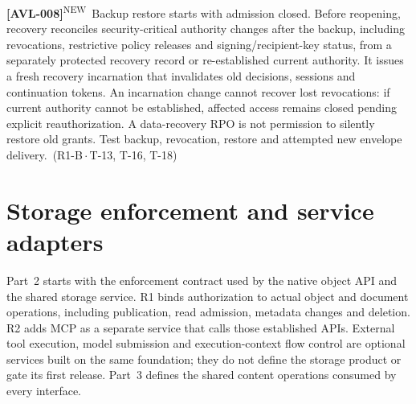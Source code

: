 \documentclass[11pt,a4paper]{article}
\newcommand{\reqtag}[2]{{\footnotesize\color{accent}(#1\,$\cdot$\,#2)}}
\newcommand{\reqn}[4]{\par\noindent\hypertarget{req:#1}{\textbf{[#1]}}\textsuperscript{\color{accent}\tiny NEW}\ #4\ \reqtag{#2}{#3}\par}
\begin{document}
\reqn{AVL-008}{R1-B}{T-13, T-16, T-18}{Backup restore starts with admission closed. Before reopening, recovery reconciles security-critical authority changes after the backup, including revocations, restrictive policy releases and signing/recipient-key status, from a separately protected recovery record or re-established current authority. It issues a fresh recovery incarnation that invalidates old decisions, sessions and continuation tokens. An incarnation change cannot recover lost revocations: if current authority cannot be established, affected access remains closed pending explicit reauthorization. A data-recovery RPO is not permission to silently restore old grants. Test backup, revocation, restore and attempted new envelope delivery.}


\section{Storage enforcement and service adapters}\label{sec:enforcement}
Part~2 starts with the enforcement contract used by the native object API and the shared storage service. R1 binds authorization to actual object and document operations, including publication, read admission, metadata changes and deletion. R2 adds MCP as a separate service that calls those established APIs. External tool execution, model submission and execution-context flow control are optional services built on the same foundation; they do not define the storage product or gate its first release. Part~3 defines the shared content operations consumed by every interface.
\end{document}

